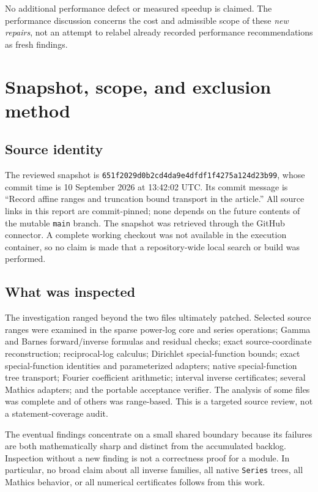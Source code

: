 \documentclass[11pt,a4paper]{article}
\newcommand{\code}[1]{\nolinkurl{#1}}
\newcommand{\revision}{\texttt{651f2029d0b2cd4da9e4dfdf1f4275a124d23b99}}
\begin{document}
No additional performance defect or measured speedup is claimed. The performance discussion concerns the cost and admissible scope of these \emph{new repairs}, not an attempt to relabel already recorded performance recommendations as fresh findings.

\section{Snapshot, scope, and exclusion method}
\subsection{Source identity}

The reviewed snapshot is \revision, whose commit time is 10 September 2026 at 13:42:02 UTC. Its commit message is ``Record affine ranges and truncation bound transport in the article.'' All source links in this report are commit-pinned; none depends on the future contents of the mutable \code{main} branch. The snapshot was retrieved through the GitHub connector. A complete working checkout was not available in the execution container, so no claim is made that a repository-wide local search or build was performed.\cite{repo}

\subsection{What was inspected}

The investigation ranged beyond the two files ultimately patched. Selected source ranges were examined in the sparse power-log core and series operations; Gamma and Barnes forward/inverse formulas and residual checks; exact source-coordinate reconstruction; reciprocal-log calculus; Dirichlet special-function bounds; exact special-function identities and parameterized adapters; native special-function tree transport; Fourier coefficient arithmetic; interval inverse certificates; several Mathics adapters; and the portable acceptance verifier. The analysis of some files was complete and of others was range-based. This is a targeted source review, not a statement-coverage audit.

The eventual findings concentrate on a small shared boundary because its failures are both mathematically sharp and distinct from the accumulated backlog. Inspection without a new finding is not a correctness proof for a module. In particular, no broad claim about all inverse families, all native \code{Series} trees, all Mathics behavior, or all numerical certificates follows from this work.
\end{document}
